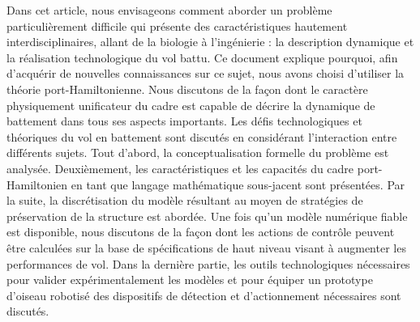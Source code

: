 \documentclass[french]{article}
\begin{document}
Dans cet article, nous envisageons comment aborder un problème particulièrement difficile qui présente des caractéristiques hautement interdisciplinaires, allant de la biologie à l'ingénierie : la description dynamique et la réalisation technologique du vol battu. Ce document explique pourquoi, afin d'acquérir de nouvelles connaissances sur ce sujet, nous avons choisi d'utiliser la théorie port-Hamiltonienne. Nous discutons de la façon dont le caractère physiquement unificateur du cadre est capable de décrire la dynamique de battement dans tous ses aspects importants. Les défis technologiques et théoriques du vol en battement sont discutés en considérant l'interaction entre différents sujets. Tout d'abord, la conceptualisation formelle du problème est analysée. Deuxièmement, les caractéristiques et les capacités du cadre port-Hamiltonien en tant que langage mathématique sous-jacent sont présentées. Par la suite, la discrétisation du modèle résultant au moyen de stratégies de préservation de la structure est abordée. Une fois qu'un modèle numérique fiable est disponible, nous discutons de la façon dont les actions de contrôle peuvent être calculées sur la base de spécifications de haut niveau visant à augmenter les performances de vol. Dans la dernière partie, les outils technologiques nécessaires pour valider expérimentalement les modèles et pour équiper un prototype d'oiseau robotisé des dispositifs de détection et d'actionnement nécessaires sont discutés.



	
\end{document}
